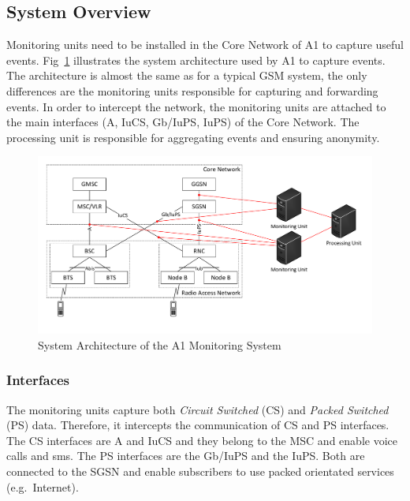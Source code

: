\documentclass[master,english]{hgbthesis}
\begin{document}
%
\subsection{System Overview}
Monitoring units need to be installed in the Core Network of A1 to capture useful events. Fig~\ref{fig:A1Network} illustrates the system architecture used by A1 to capture events. The architecture is almost the same as for a typical GSM system, the only differences are the monitoring units responsible for capturing and forwarding events.
In order to intercept the network, the monitoring units are attached to the main interfaces (A, IuCS, Gb/IuPS, IuPS) of the Core Network. The processing unit is responsible for aggregating events and ensuring anonymity.
\begin{figure}
	\centering
	\includegraphics[width=\linewidth]{./images/A1Network}
	\caption{System Architecture of the A1 Monitoring System}
	\label{fig:A1Network}
\end{figure}
\subsubsection{Interfaces}
The monitoring units capture both \emph{Circuit Switched} (CS) and \emph{Packed Switched} (PS) data. Therefore, it intercepts the communication of CS and PS interfaces. The CS interfaces are A and IuCS and they belong to the MSC and enable voice calls and sms. The PS interfaces are the Gb/IuPS and the IuPS. Both are connected to the SGSN and enable subscribers to use packed orientated services (e.g.\ Internet).
\end{document}
